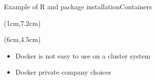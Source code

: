 \begin{frame}{Example of R and package installation}{Containers}
\begin{textblock*}{10cm}(1cm,7.2cm) %
\end{textblock*}

\begin{textblock*}{10cm}(6cm,4.5cm) %
\end{textblock*}
\end{frame}


\begin{frame}

\begin{itemize}[<3>]
	\item Docker is not easy to use on a cluster system
	\item Docker private company choices
\end{itemize}
\end{frame}

